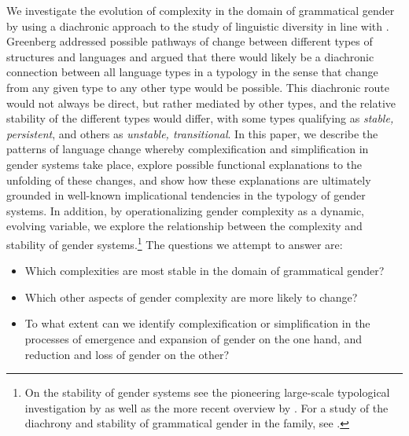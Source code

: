 \documentclass[output=collectionpaper]{langsci/langscibook}
\begin{document}
We investigate the evolution of complexity in the domain of grammatical gender by using a diachronic approach to the study of linguistic diversity in line with \citet{Greenberg1978a}. Greenberg addressed possible pathways of change between different types of structures and languages and argued that there would likely be a diachronic connection between all language types in a typology in the sense that change from any given type to any other type would be possible. This diachronic route would not always be direct, but rather mediated by other types, and the relative stability of the different types would differ, with some types qualifying as \textit{stable, persistent}, and others as \textit{unstable, transitional}. In this paper, we describe the patterns of language change whereby complexification and simplification in gender systems take place, explore possible functional explanations to the unfolding of these changes, and show how these explanations are ultimately grounded in well-known implicational tendencies in the typology of gender systems. In addition, by operationalizing gender complexity as a dynamic, evolving variable, we explore the relationship between the complexity and stability of gender systems.\footnote{On the stability of gender systems see the pioneering large-scale typological investigation by \citet{Nichols1992} as well as the more recent overview by \citet{Nichols2003}. For a study of the diachrony and stability of grammatical gender in the  family, see \citet{Matasovic2004}.} The questions we attempt to answer are:
\begin{itemize}
\item Which complexities are most stable in the domain of grammatical gender?
\item Which other aspects of gender complexity are more likely to change?
\item To what extent can we identify complexification or simplification in the processes of emergence and expansion of gender on the one hand, and reduction and loss of gender on the other?
\end{itemize}
\end{document}
